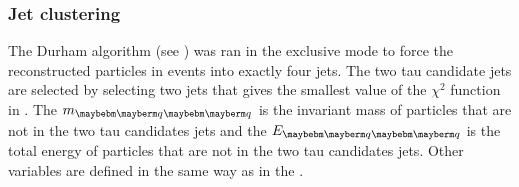 \subsubsection{Jet clustering}


The Durham algorithm  (see ) was ran in the exclusive mode to force the reconstructed particles in \eeZZQQ events into exactly four jets. The two tau candidate jets are selected by selecting two jets that gives the smallest value of the $\chi^2$ function in . The $m_{\Pquark\Pquark}$ is the invariant mass of particles that are not in the two tau candidates jets and the $E_{\Pquark\Pquark}$ is  the total energy of particles that are not in the two tau candidates jets. Other variables are defined in the same way as in the .




